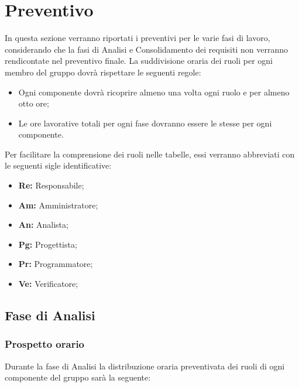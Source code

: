 \section{Preventivo}
	In questa sezione verranno riportati i preventivi per le varie fasi di lavoro, considerando che la fasi di Analisi e Consolidamento dei requisiti non verranno rendicontate nel preventivo finale. 
	La suddivisione oraria dei ruoli per ogni membro del gruppo dovrà rispettare le seguenti regole:
		\begin{itemize}
		\item Ogni componente dovrà ricoprire almeno una volta ogni ruolo e per almeno otto ore;
		\item Le ore lavorative totali per ogni fase dovranno essere le stesse per ogni componente.
	\end{itemize}
	 Per facilitare la comprensione dei ruoli nelle tabelle, essi verranno abbreviati con le seguenti sigle identificative:
			\begin{itemize}
			\item\textbf{Re:} Responsabile;
			\item\textbf{Am:} Amministratore;
			\item\textbf{An:} Analista;
			\item\textbf{Pg:} Progettista;
			\item\textbf{Pr:} Programmatore;
			\item\textbf{Ve:} Verificatore;
		\end{itemize}
	\subsection{Fase di Analisi}
		\subsubsection{Prospetto orario}
			Durante la fase di Analisi la distribuzione oraria preventivata dei ruoli di ogni componente del gruppo sarà la seguente:
			
